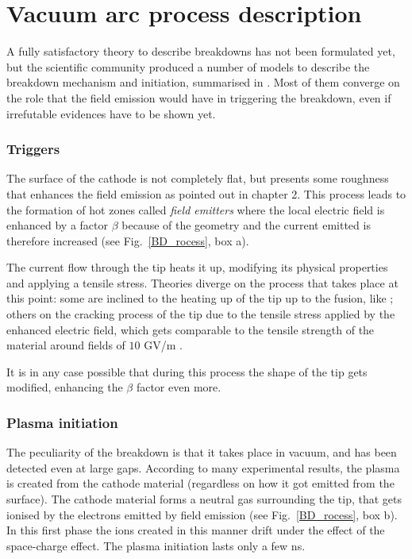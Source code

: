 \section[Vacuum arc process description]{Vacuum arc process description}

A fully satisfactory theory to describe breakdowns has not been formulated yet, but the scientific community produced a number of models to describe the breakdown mechanism and initiation, summarised in \cite{soviet:1983,davies:triggers}. Most of them converge on the role that the field emission would have in triggering the breakdown, even if irrefutable  evidences have to be shown yet.

\subsubsection[Triggers]{Triggers}

The surface of the cathode is not completely flat, but presents some roughness that enhances the field emission as pointed out in chapter 2. This process leads to the formation of hot zones called \textit{field emitters} where the local electric field is enhanced by a factor $\beta$ because of the geometry and the current emitted is therefore increased (see Fig.~\ref{BD_rocess}, box a). 

The current flow through the tip heats it up, modifying its physical properties and applying a tensile stress. Theories diverge on the process that takes place at this point: some are inclined to the heating up of the tip up to the fusion, like \cite{Grudiev:newLoc}; others on the cracking process of the tip due to the tensile stress applied by the enhanced electric field, which gets comparable to the tensile strength of the material around fields of $10$ GV/m  \cite{Insepov:1373092}.

It is in any case possible that during this process the shape of the tip gets modified, enhancing the $\beta$ factor even more.


\subsubsection[Plasma initiation]{Plasma initiation}

The peculiarity of the breakdown is that it takes place in vacuum, and has been detected even at large gaps. According to many experimental results, the plasma is created from the cathode material (regardless on how it got emitted from the surface). The cathode material forms a neutral gas surrounding the tip, that gets ionised by the electrons emitted by field emission (see Fig.~\ref{BD_rocess}, box b). In this first phase the ions created in this manner drift under the effect of the space-charge effect. The plasma initiation lasts only a few ns.

